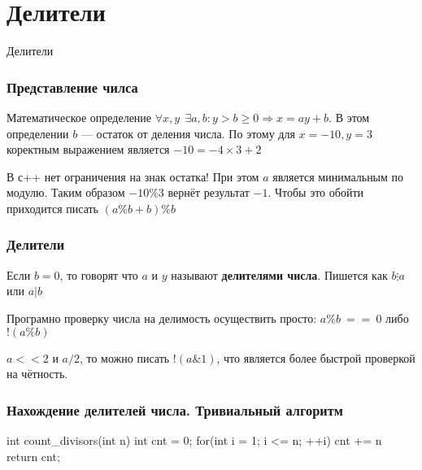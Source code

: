 \section{Делители}


\begin{frame}
    \center \Huge Делители 
\end{frame}


\begin{frame}
	\frametitle{Представление чилса}

    \quad Математическое определение $\forall x, y ~~\exists a, b: y > b \geq 0 \Rightarrow x = ay + b$. В этом определении $b$ --- остаток от деления числа. По этому для $x=-10, y=3$ коректным выражением является $-10 = -4 \times 3 + 2$

    \quad В с++ нет ограничения на знак остатка! При этом $a$ является минимальным по модулю. Таким образом $-10\%3$ вернёт результат $-1$. Чтобы это обойти приходится писать $(a\%b+b)\%b$


\end{frame}


\begin{frame}
	\frametitle{Делители}

\quad Если $b=0$, то говорят что $a$ и $y$ называют \textbf{делителями числа}. Пишется как $b\vdots a$ или $a|b$
    
    \quad Програмно проверку числа на делимость осуществить просто: $a\%b~==~0$ либо $!(a\%b)$

     $a<<2$ и $a/2$, то можно писать $!(a\text{\&}1)$, что является более быстрой проверкой на чётность. 

\end{frame}


\begin{frame}[fragile]
	\frametitle{Нахождение делителей числа. Тривиальный алгоритм}

    \begin{cpp}
int count_divisors(int n){
    int cnt = 0;
    for(int i = 1; i <= n; ++i){
        cnt += n%
    }
    return cnt;
}
    \end{cpp}

\end{frame}

